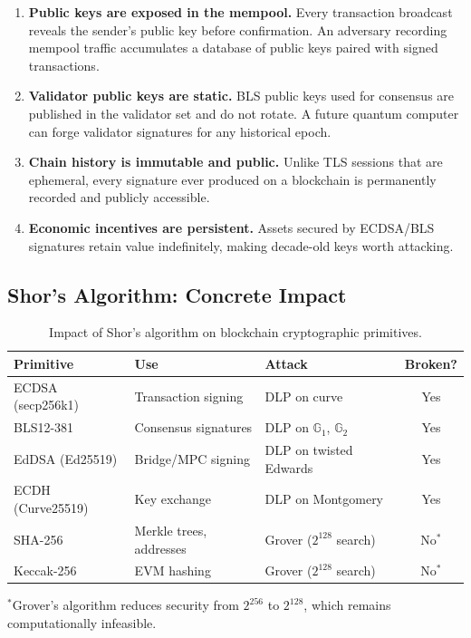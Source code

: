 \begin{enumerate}[leftmargin=2em]
  \item \textbf{Public keys are exposed in the mempool.} Every transaction broadcast
        reveals the sender's public key before confirmation. An adversary recording
        mempool traffic accumulates a database of public keys paired with signed
        transactions.
  \item \textbf{Validator public keys are static.} BLS public keys used for consensus
        are published in the validator set and do not rotate. A future quantum computer
        can forge validator signatures for any historical epoch.
  \item \textbf{Chain history is immutable and public.} Unlike TLS sessions that
        are ephemeral, every signature ever produced on a blockchain is permanently
        recorded and publicly accessible.
  \item \textbf{Economic incentives are persistent.} Assets secured by ECDSA/BLS
        signatures retain value indefinitely, making decade-old keys worth attacking.
\end{enumerate}

\subsection{Shor's Algorithm: Concrete Impact}

\begin{table}[ht]
\centering
\caption{Impact of Shor's algorithm on blockchain cryptographic primitives.}
\label{tab:shor-impact}
\begin{tabular}{lllc}
\toprule
\textbf{Primitive} & \textbf{Use} & \textbf{Attack} & \textbf{Broken?} \\
\midrule
ECDSA (secp256k1) & Transaction signing & DLP on curve & Yes \\
BLS12-381 & Consensus signatures & DLP on $\mathbb{G}_1$, $\mathbb{G}_2$ & Yes \\
EdDSA (Ed25519) & Bridge/MPC signing & DLP on twisted Edwards & Yes \\
ECDH (Curve25519) & Key exchange & DLP on Montgomery & Yes \\
SHA-256 & Merkle trees, addresses & Grover ($2^{128}$ search) & No$^*$ \\
Keccak-256 & EVM hashing & Grover ($2^{128}$ search) & No$^*$ \\
\bottomrule
\end{tabular}
\vspace{0.3em}
\footnotesize{$^*$Grover's algorithm reduces security from $2^{256}$ to $2^{128}$,
which remains computationally infeasible.}
\end{table}

